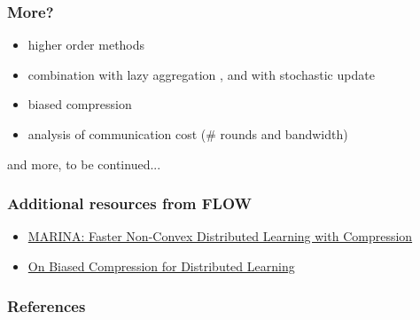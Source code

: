 
\begin{frame}
\frametitle{More?}

\begin{itemize}
    \item higher order methods \cite{crane2019dingo,islamov2021distributed}
    \item combination with lazy aggregation \cite{issaid2020cq-ggadmm}, and with stochastic update
    \item biased compression \cite{beznosikov2020biased,safaryan2020uncertainty}
    \item analysis of communication cost (\# rounds and bandwidth)
\end{itemize}

\pause
\vspace{0.6em}

and more, to be continued...

\end{frame}


\begin{frame}
\frametitle{Additional resources from FLOW}

\begin{itemize}
    \item \href{https://sites.google.com/view/one-world-seminar-series-flow/archive/2021\#h.x17wddrti6j0}{MARINA: Faster Non-Convex Distributed Learning with Compression}
    \vspace{1em}
    \item \href{https://sites.google.com/view/one-world-seminar-series-flow/archive/2020\#h.5y43fcudf8t}{On Biased Compression for Distributed Learning}
\end{itemize}

\end{frame}


\begin{frame}[allowframebreaks]
\frametitle{References}

{\footnotesize


}

\end{frame}




